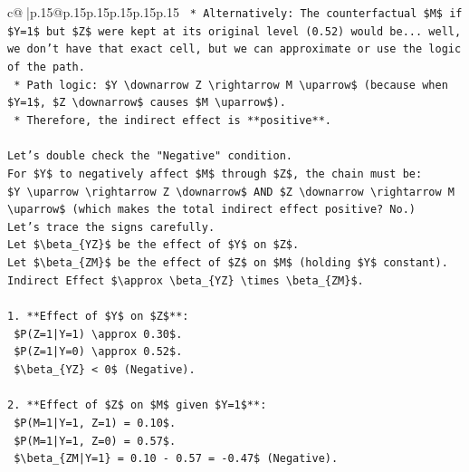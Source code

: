 \documentclass{article}
\begin{document}
{\begin{supertabular}{c@{$\;$}|p{.15\linewidth}@{}p{.15\linewidth}p{.15\linewidth}p{.15\linewidth}p{.15\linewidth}p{.15\linewidth}}
{{{\texttt{    *   Alternatively: The counterfactual \$M\$ if \$Y=1\$ but \$Z\$ were kept at its original level (0.52) would be... well, we don't have that exact cell, but we can approximate or use the logic of the path.} \\
\texttt{    *   Path logic: \$Y \textbackslash{}downarrow Z \textbackslash{}rightarrow M \textbackslash{}uparrow\$ (because when \$Y=1\$, \$Z \textbackslash{}downarrow\$ causes \$M \textbackslash{}uparrow\$).} \\
\texttt{    *   Therefore, the indirect effect is **positive**.} \\
\\ 
\texttt{Let's double check the "Negative" condition.} \\
\texttt{For \$Y\$ to negatively affect \$M\$ through \$Z\$, the chain must be:} \\
\texttt{\$Y \textbackslash{}uparrow \textbackslash{}rightarrow Z \textbackslash{}downarrow\$ AND \$Z \textbackslash{}downarrow \textbackslash{}rightarrow M \textbackslash{}uparrow\$ (which makes the total indirect effect positive? No.)} \\
\texttt{Let's trace the signs carefully.} \\
\texttt{Let \$\textbackslash{}beta\_\{YZ\}\$ be the effect of \$Y\$ on \$Z\$.} \\
\texttt{Let \$\textbackslash{}beta\_\{ZM\}\$ be the effect of \$Z\$ on \$M\$ (holding \$Y\$ constant).} \\
\texttt{Indirect Effect \$\textbackslash{}approx \textbackslash{}beta\_\{YZ\} \textbackslash{}times \textbackslash{}beta\_\{ZM\}\$.} \\
\\ 
\texttt{1.  **Effect of \$Y\$ on \$Z\$**:} \\
\texttt{    \$P(Z=1|Y=1) \textbackslash{}approx 0.30\$.} \\
\texttt{    \$P(Z=1|Y=0) \textbackslash{}approx 0.52\$.} \\
\texttt{    \$\textbackslash{}beta\_\{YZ\} < 0\$ (Negative).} \\
\\ 
\texttt{2.  **Effect of \$Z\$ on \$M\$ given \$Y=1\$**:} \\
\texttt{    \$P(M=1|Y=1, Z=1) = 0.10\$.} \\
\texttt{    \$P(M=1|Y=1, Z=0) = 0.57\$.} \\
\texttt{    \$\textbackslash{}beta\_\{ZM|Y=1\} = 0.10 {-} 0.57 = {-}0.47\$ (Negative).} \\
\\ 
}}}
\end{supertabular}}
\end{document}
